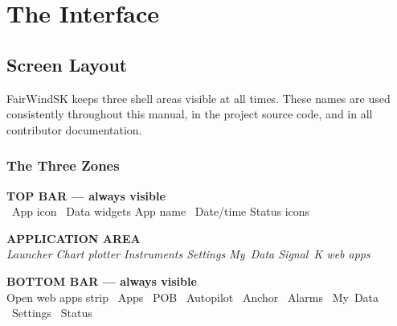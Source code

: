 \part{The Interface}

\chapter{Screen Layout}

FairWindSK keeps three shell areas visible at all times.
These names are used consistently throughout this manual, in the project source code,
and in all contributor documentation.

\section{The Three Zones}

\begin{center}
\begin{tcolorbox}[enhanced,colback=LtBlue,colframe=Navy,boxrule=1.5pt,arc=4pt,
  top=7pt,bottom=5pt,left=12pt,right=12pt,width=0.96\textwidth]
  {\sffamily\bfseries\color{Navy}TOP BAR --- always visible}\\[3pt]
  {\small{}~App icon \quad
         ~Data widgets \quad
         App name \quad
         ~Date/time \quad
         Status icons}
\end{tcolorbox}
\vspace{2pt}
\begin{tcolorbox}[enhanced,colback=white,colframe=Navy,boxrule=1.5pt,arc=4pt,
  top=26pt,bottom=26pt,left=12pt,right=12pt,width=0.96\textwidth]
  \centering
  {\large\sffamily\bfseries\color{MidGray}APPLICATION AREA}\\[4pt]
  {\small\sffamily\color{MidGray}\itshape
    Launcher \textbar{} Chart plotter \textbar{} Instruments \textbar{}
    Settings \textbar{} My~Data \textbar{} Signal~K web apps}
\end{tcolorbox}
\vspace{2pt}
\begin{tcolorbox}[enhanced,colback=LtBlue,colframe=Navy,boxrule=1.5pt,arc=4pt,
  top=7pt,bottom=5pt,left=12pt,right=12pt,width=0.96\textwidth]
  {\sffamily\bfseries\color{Navy}BOTTOM BAR --- always visible}\\[3pt]
  {\small
    Open web apps strip \quad
    ~Apps \quad
    ~POB \quad
    ~Autopilot \quad
    ~Anchor \quad
    ~Alarms \quad
    ~My~Data \quad
    ~Settings \quad
    ~Status}
\end{tcolorbox}
\end{center}

